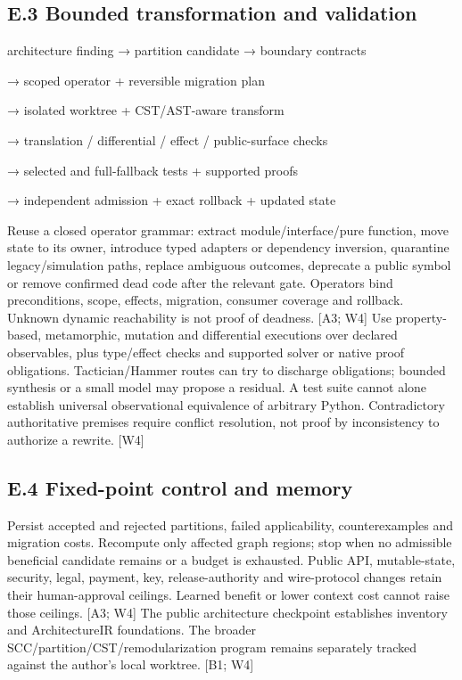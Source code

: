 \subsection*{E.3 Bounded transformation and validation}

\noindent architecture finding → partition candidate → boundary contracts\par
\noindent → scoped operator + reversible migration plan\par
\noindent → isolated worktree + CST/AST-aware transform\par
\noindent → translation / differential / effect / public-surface checks\par
\noindent → selected and full-fallback tests + supported proofs\par
\noindent → independent admission + exact rollback + updated state\par

Reuse a closed operator grammar: extract module/interface/pure function, move state to its owner,
introduce typed adapters or dependency inversion, quarantine legacy/simulation paths, replace
ambiguous outcomes, deprecate a public symbol or remove confirmed dead code after the relevant
gate. Operators bind preconditions, scope, effects, migration, consumer coverage and rollback.
Unknown dynamic reachability is not proof of deadness. [A3; W4]
Use property-based, metamorphic, mutation and differential executions over declared observables,
plus type/effect checks and supported solver or native proof obligations. Tactician/Hammer routes
can try to discharge obligations; bounded synthesis or a small model may propose a residual. A test
suite cannot alone establish universal observational equivalence of arbitrary Python. Contradictory
authoritative premises require conflict resolution, not proof by inconsistency to authorize a rewrite.
[W4]

\subsection*{E.4 Fixed-point control and memory}

Persist accepted and rejected partitions, failed applicability, counterexamples and migration costs.
Recompute only affected graph regions; stop when no admissible beneficial candidate remains or a
budget is exhausted. Public API, mutable-state, security, legal, payment, key, release-authority and
wire-protocol changes retain their human-approval ceilings. Learned benefit or lower context cost
cannot raise those ceilings. [A3; W4]
The public architecture checkpoint establishes inventory and ArchitectureIR foundations. The broader
SCC/partition/CST/remodularization program remains separately tracked against the author’s local
worktree. [B1; W4]

